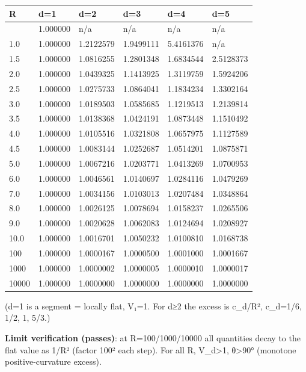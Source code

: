 \documentclass[
]{ltjsarticle}
\newcounter{none} %
\begin{document}
{\def\LTcaptype{none} %
\begin{longtable}[]{@{}llllll@{}}
\toprule\noalign{}
R & d=1 & d=2 & d=3 & d=4 & d=5 \\
\midrule\noalign{}
\endhead
\bottomrule\noalign{}
\endlastfoot
0.5 & 1.000000 & n/a & n/a & n/a & n/a \\
1.0 & 1.000000 & 1.2122579 & 1.9499111 & 5.4161376 & n/a \\
1.5 & 1.000000 & 1.0816255 & 1.2801348 & 1.6834544 & 2.5128373 \\
2.0 & 1.000000 & 1.0439325 & 1.1413925 & 1.3119759 & 1.5924206 \\
2.5 & 1.000000 & 1.0275733 & 1.0864041 & 1.1834234 & 1.3302164 \\
3.0 & 1.000000 & 1.0189503 & 1.0585685 & 1.1219513 & 1.2139814 \\
3.5 & 1.000000 & 1.0138368 & 1.0424191 & 1.0873448 & 1.1510492 \\
4.0 & 1.000000 & 1.0105516 & 1.0321808 & 1.0657975 & 1.1127589 \\
4.5 & 1.000000 & 1.0083144 & 1.0252687 & 1.0514201 & 1.0875871 \\
5.0 & 1.000000 & 1.0067216 & 1.0203771 & 1.0413269 & 1.0700953 \\
6.0 & 1.000000 & 1.0046561 & 1.0140697 & 1.0284116 & 1.0479269 \\
7.0 & 1.000000 & 1.0034156 & 1.0103013 & 1.0207484 & 1.0348864 \\
8.0 & 1.000000 & 1.0026125 & 1.0078694 & 1.0158237 & 1.0265506 \\
9.0 & 1.000000 & 1.0020628 & 1.0062083 & 1.0124694 & 1.0208927 \\
10.0 & 1.000000 & 1.0016701 & 1.0050232 & 1.0100810 & 1.0168738 \\
100 & 1.000000 & 1.0000167 & 1.0000500 & 1.0001000 & 1.0001667 \\
1000 & 1.000000 & 1.0000002 & 1.0000005 & 1.0000010 & 1.0000017 \\
10000 & 1.000000 & 1.0000000 & 1.0000000 & 1.0000000 & 1.0000000 \\
\end{longtable}
}

(d=1 is a segment = locally flat, V₁=1. For d≥2 the excess is c\_d/R²,
c\_d=1/6, 1/2, 1, 5/3.)

\textbf{Limit verification (passes)}: at R=100/1000/10000 all quantities
decay to the flat value as 1/R² (factor 100² each step). For all R,
V\_d\textgreater1, θ\textgreater90° (monotone positive-curvature
excess).
\end{document}
